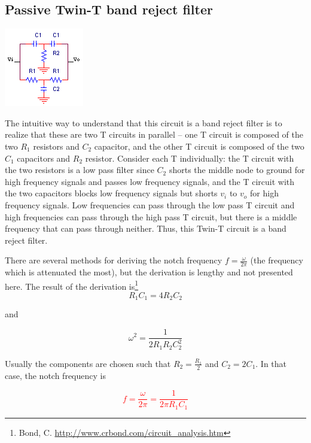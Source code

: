 \subsection{Passive Twin-T band reject filter}
\begin{center}
	\includegraphics{schematics/passiveTwinTbandrejectfilter.PNG}
\end{center}
The intuitive way to understand that this circuit is a band reject filter is to realize that these are two T circuits in parallel -- one T circuit is composed of the two $R_{1}$ resistors and $C_{2}$ capacitor, and the other T circuit is composed of the two $C_{1}$ capacitors and $R_{2}$ resistor. Consider each T individually: the T circuit with the two resistors is a low pass filter since $C_{2}$ shorts the middle node to ground for high frequency signals and passes low frequency signals, and the T circuit with the two capacitors blocks low frequency signals but shorts $v_{i}$ to $v_{o}$ for high frequency signals. Low frequencies can pass through the low pass T circuit and high frequencies can pass through the high pass T circuit, but there is a middle frequency that can pass through neither. Thus, this Twin-T circuit is a band reject filter.
\par There are several methods for deriving the notch frequency $f = \frac{\omega}{2\pi}$ (the frequency which is attenuated the most), but the derivation is lengthy and not presented here. The result of the derivation is\footnote{Bond, C. \href{http://www.crbond.com/circuit\_analysis.htm}{http://www.crbond.com/circuit\_analysis.htm}}
\begin{equation}R_{1}C_{1} = 4R_{2}C_{2}
\end{equation}

and

\begin{equation}
\omega^{2} = \frac{1}{2R_{1}R_{2}C_{2}^{2}}
\end{equation}

Usually the components are chosen such that $R_{2} = \frac{R_{1}}{2}$ and $C_{2} = 2C_{1}$. In that case, the notch frequency is

\textcolor{red}{
\begin{equation}
f = \frac{\omega}{2\pi} = \frac{1}{2\pi R_{1}C_{1}}
\label{eq:passiveTwinTnotchfreq}
\end{equation}
}

